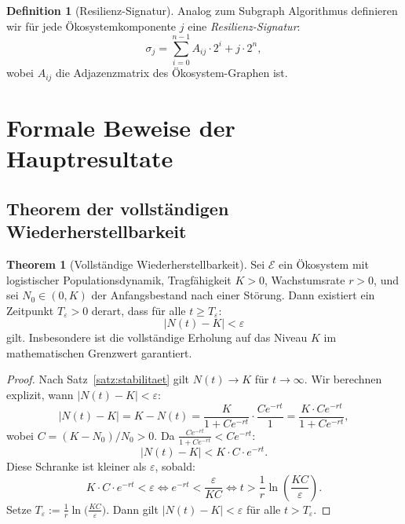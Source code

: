 ﻿\documentclass[a4paper,12pt]{article}
\theoremstyle{definition}
\newtheorem{definition}{Definition}
\newtheorem{theorem}{Theorem}
\begin{document}
\begin{definition}[Resilienz-Signatur]
	Analog zum Subgraph Algorithmus \cite{epp2026subgraph} definieren wir für jede Ökosystemkomponente $j$ eine \emph{Resilienz-Signatur}:
	\[
	\sigma_j = \sum_{i=0}^{n-1} A_{ij} \cdot 2^i + j \cdot 2^n,
	\]
	wobei $A_{ij}$ die Adjazenzmatrix des Ökosystem-Graphen ist.
\end{definition}

\section{Formale Beweise der Hauptresultate}
\label{sec:beweise}

\subsection{Theorem der vollständigen Wiederherstellbarkeit}

\begin{theorem}[Vollständige Wiederherstellbarkeit]
	\label{thm:wiederherstellung}
	Sei $\mathcal{E}$ ein Ökosystem mit logistischer Populationsdynamik, Tragfähigkeit $K > 0$, Wachstumsrate $r > 0$, und sei $N_0 \in (0, K)$ der Anfangsbestand nach einer Störung. Dann existiert ein Zeitpunkt $T_\varepsilon > 0$ derart, dass für alle $t \geq T_\varepsilon$:
	\[
	|N(t) - K| < \varepsilon
	\]
	gilt. Insbesondere ist die vollständige Erholung auf das Niveau $K$ im mathematischen Grenzwert garantiert.
\end{theorem}

\begin{proof}
	Nach Satz~\ref{satz:stabilitaet} gilt $N(t) \to K$ für $t \to \infty$. Wir berechnen explizit, wann $|N(t) - K| < \varepsilon$:
	\[
	|N(t) - K| = K - N(t) = \frac{K}{1 + Ce^{-rt}} \cdot \frac{Ce^{-rt}}{1} = \frac{K \cdot C e^{-rt}}{1 + C e^{-rt}},
	\]
	wobei $C = (K - N_0)/N_0 > 0$. Da $\frac{C e^{-rt}}{1 + C e^{-rt}} < C e^{-rt}$:
	\[
	|N(t) - K| < K \cdot C \cdot e^{-rt}.
	\]
	Diese Schranke ist kleiner als $\varepsilon$, sobald:
	\[
	K \cdot C \cdot e^{-rt} < \varepsilon \iff e^{-rt} < \frac{\varepsilon}{KC} \iff t > \frac{1}{r} \ln\!\left(\frac{KC}{\varepsilon}\right).
	\]
	Setze $T_\varepsilon := \frac{1}{r} \ln\!\bigl(\frac{KC}{\varepsilon}\bigr)$. Dann gilt $|N(t) - K| < \varepsilon$ für alle $t > T_\varepsilon$. \qedhere
\end{proof}
\end{document}
